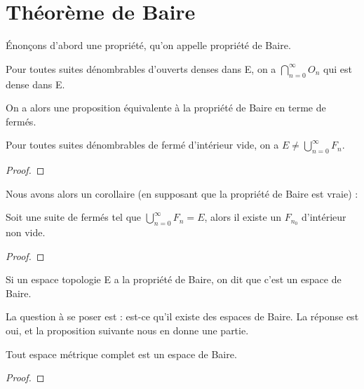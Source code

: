 \section{Théorème de Baire}

Énonçons d'abord une propriété, qu'on appelle propriété de Baire.

\begin{propriete} 
	Pour toutes suites dénombrables d'ouverts denses dans E, on a $\displaystyle
	\bigcap_{n = 0}^{\infty} O_{n}$ qui est dense dans E.
\end{propriete}

On a alors une proposition équivalente à la propriété de Baire en terme de
fermés.

\begin{propriete} 
	Pour toutes suites dénombrables de fermé d'intérieur vide, on a $E \neq
	\displaystyle \bigcup_{n = 0}^{\infty} F_{n}$.
\end{propriete}

\begin{proof}
	
\end{proof}

Nous avons alors un corollaire (en supposant que la propriété de Baire est
vraie) :

\begin{corollary}
	Soit une suite  de fermés tel que $\displaystyle
	\bigcup_{n = 0}^{\infty}{F_{n}} = E$, alors il existe un $F_{n_{0}}$
	d'intérieur non vide.
\end{corollary}

\begin{proof}
	
\end{proof}

\begin{definition} 
	Si un espace topologie E a la propriété de Baire, on dit que c'est un espace
	de Baire.
\end{definition}

La question à se poser est : est-ce qu'il existe des espaces de Baire. La
réponse est oui, et la proposition suivante nous en donne une partie.

\begin{proposition}
	Tout espace métrique complet est un espace de Baire.
\end{proposition}

\begin{proof}
	
\end{proof}

